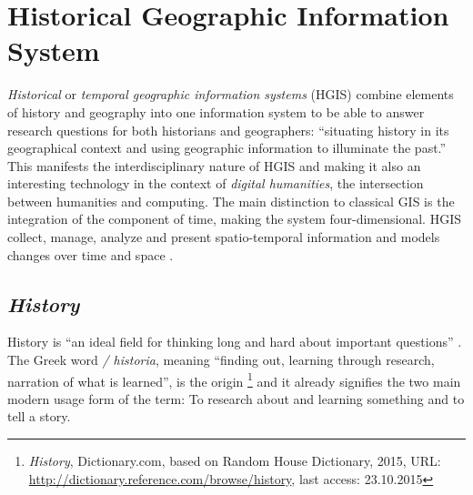 





\section{Historical Geographic Information System} %
\label{sub:historical_geographic_information_system}

\emph{Historical} or \emph{temporal geographic information systems} (HGIS) combine elements of history and geography into one information system to be able to answer research questions for both historians and geographers: ``situating history in its geographical context and using geographic information to illuminate the past.''
\cite[p. 3]{knowles2008placing}
This manifests the interdisciplinary nature of HGIS and making it also an interesting technology in the context of \emph{digital humanities}, the intersection between humanities and computing. The main distinction to classical GIS is the integration of the component of time, making the system four-dimensional. HGIS collect, manage, analyze and present spatio-temporal information and models changes over time and space
\cite[p. xii]{knowles2002past}.


\subsection{\emph{History}} %

History is ``an ideal field for thinking long and hard about important questions''
\cite{ahaFiveCs}.
The Greek word \emph{\textIota\textsigma\texttau\textomikron\textrho\textiota\textalpha / historia}, meaning ``finding out, learning through research, narration of what is learned'', is the origin
\footnote{
  \textit{History},
  Dictionary.com, based on Random House Dictionary, 2015,
  URL: \url{http://dictionary.reference.com/browse/history},
  last access: 23.10.2015
}
and it already signifies the two main modern usage form of the term: To research about and learning something and to tell a story.

